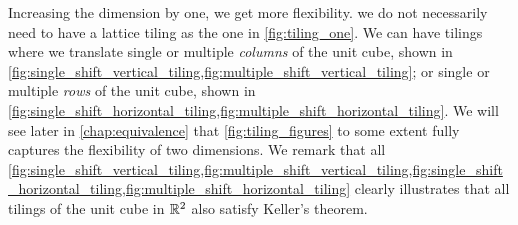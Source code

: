 \documentclass[../thesis.tex]{subfiles}
\begin{document}
Increasing the dimension by one, we get more flexibility.  we do not necessarily need to have a lattice tiling as the one in \cref{fig:tiling_one}. We can have tilings where we translate single or multiple \emph{columns} of the unit cube, shown in \cref{fig:single_shift_vertical_tiling,fig:multiple_shift_vertical_tiling}; or single or multiple \emph{rows} of the unit cube, shown in \cref{fig:single_shift_horizontal_tiling,fig:multiple_shift_horizontal_tiling}. We will see later in \cref{chap:equivalence} that \cref{fig:tiling_figures} to some extent fully captures the flexibility of two dimensions. We remark that all \cref{fig:single_shift_vertical_tiling,fig:multiple_shift_vertical_tiling,fig:single_shift_horizontal_tiling,fig:multiple_shift_horizontal_tiling} clearly illustrates that all tilings of the unit cube in $\mathbb{R}^2$ also satisfy Keller's theorem. 







\end{document}
